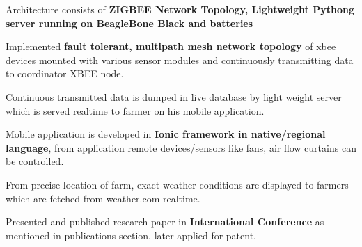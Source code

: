 \begin{cventries}
{\begin{cvitems}
        \item {Architecture consists of \textbf{ZIGBEE Network Topology, Lightweight Pythong server running on BeagleBone Black and batteries}}
        \item {Implemented \textbf{fault tolerant, multipath mesh network topology} of xbee devices mounted with various sensor modules and continuously transmitting data to coordinator XBEE node.}
        \item {Continuous transmitted data is dumped in live database by light weight server which is served realtime to farmer on his mobile application. }
        \item{Mobile application is developed in \textbf{Ionic framework in native/regional language}, from application remote devices/sensors like fans, air flow curtains can be controlled.}
        \item {From precise location of farm, exact weather conditions are displayed to farmers which are fetched from weather.com realtime.}
        \item {Presented and published research paper in \textbf{International Conference} as mentioned in publications section, later applied for patent.}
      \end{cvitems}
    }
\end{cventries}
